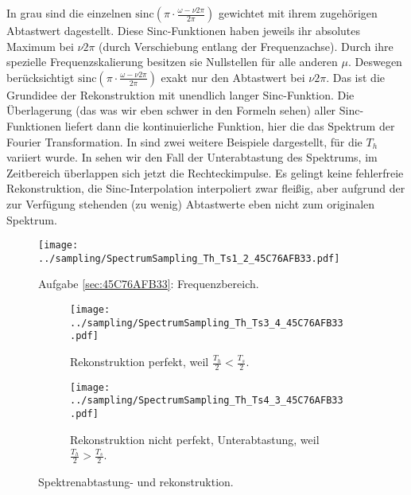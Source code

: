 \begin{Loesung}
In grau sind die einzelnen $\mathrm{sinc}(\pi\cdot\frac{\omega-\nu 2 \pi}{2\pi})$
gewichtet mit ihrem zugehörigen Abtastwert dagestellt.
Diese Sinc-Funktionen haben jeweils ihr absolutes Maximum bei $\nu 2 \pi$ (durch
Verschiebung entlang der Frequenzachse). Durch ihre spezielle Frequenzskalierung
besitzen sie Nullstellen für alle anderen $\mu$. Deswegen
berücksichtigt $\mathrm{sinc}(\pi\cdot\frac{\omega-\nu 2 \pi}{2\pi})$
exakt nur den Abtastwert bei $\nu 2 \pi$. Das ist die Grundidee der Rekonstruktion
mit unendlich langer Sinc-Funktion. Die Überlagerung (das was wir eben schwer
in den Formeln sehen) aller Sinc-Funktionen liefert dann die kontinuierliche Funktion,
hier die das Spektrum der Fourier Transformation.
%
In  sind zwei weitere Beispiele
dargestellt, für die $T_h$ variiert wurde.
In  sehen wir den Fall der
Unterabtastung des Spektrums, im Zeitbereich überlappen sich jetzt die
Rechteckimpulse. Es gelingt keine fehlerfreie Rekonstruktion, die Sinc-Interpolation
interpoliert zwar fleißig, aber aufgrund der zur Verfügung stehenden (zu wenig)
Abtastwerte eben nicht zum originalen Spektrum.
\end{Loesung}


\begin{figure}
\centering
\texttt{[image: ../sampling/SpectrumSampling\_Th\_Ts1\_2\_45C76AFB33.pdf]}
\caption{Aufgabe \ref{sec:45C76AFB33}: Frequenzbereich.}
\label{fig:SpectrumSampling_Th_Ts1_2_45C76AFB33}
\end{figure}



\begin{figure*}[h]
\centering
\begin{subfigure}{0.75\textwidth}
\texttt{[image: ../sampling/SpectrumSampling\_Th\_Ts3\_4\_45C76AFB33.pdf]}
\caption{Rekonstruktion perfekt, weil $\frac{T_h}{2}<\frac{T_s}{2}$.}
\label{fig:SpectrumSampling_Th_Ts1_1_45C76AFB33}
\end{subfigure}

\begin{subfigure}{0.75\textwidth}
\texttt{[image: ../sampling/SpectrumSampling\_Th\_Ts4\_3\_45C76AFB33.pdf]}
\caption{Rekonstruktion nicht perfekt, Unterabtastung, weil $\frac{T_h}{2}>\frac{T_s}{2}$.}
\label{fig:SpectrumSampling_Th_Ts1_1_45C76AFB33}
\end{subfigure}
\caption{Spektrenabtastung- und rekonstruktion.}
\label{fig:SpectrumSampling_Th_TsXX45C76AFB33}
\end{figure*}
